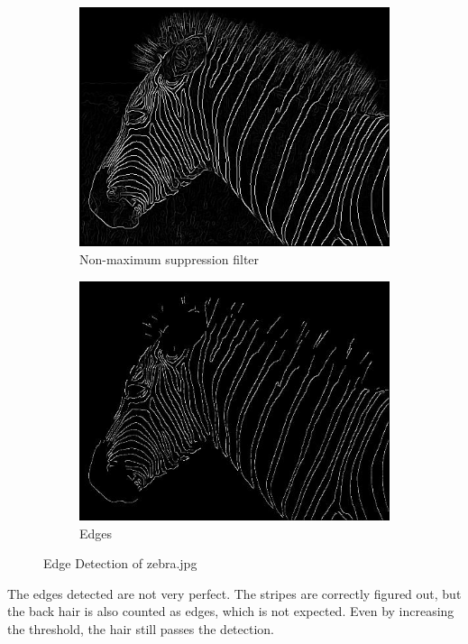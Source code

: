 \documentclass{article}
\begin{document}
\begin{figure}[htb!]
\begin{subfigure}[t]{0.2\textwidth}
			\centering
			\includegraphics[width=\textwidth]{img/zebra_nms.jpg}
			\caption{\label{fig:zebra-nms}Non-maximum suppression filter}
		\end{subfigure}
		\hfill
		\begin{subfigure}[t]{0.2\textwidth}
			\centering
			\includegraphics[width=\textwidth]{img/zebra_edge.jpg}
			\caption{\label{fig:zebra-edge}Edges}
		\end{subfigure}
		\caption{\label{fig:q2}Edge Detection of zebra.jpg}
	\end{figure}

	The edges detected are not very perfect. The stripes are correctly figured out, but the back hair is also counted as edges, which is not expected. Even by increasing the threshold, the hair still passes the detection.
\end{document}
